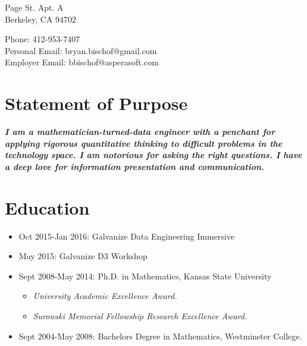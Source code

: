 \documentclass[a4paper,10pt,notitlepage]{article}
\begin{document}
\begin{multicols}{2}{
 Page St. Apt. A\\
Berkeley, CA 94702

\noindent Phone: 412-953-7407\\
Personal Email: bryan.bischof@gmail.com\\
Employer Email: bbischof@asperasoft.com
}
\end{multicols}

\vspace{-10pt}\section*{Statement of Purpose}
\noindent \textit{\textbf{I am a mathematician-turned-data engineer with a penchant for applying rigorous quantitative thinking to difficult problems in the technology space. I am notorious for asking the right questions. I have a deep love for information presentation and communication. }}


\vspace{-10pt}\section*{Education}
\begin{itemize}
	\vspace{-5pt}\item	Oct 2015-Jan 2016: Galvanize Data Engineering Immersive 
	\vspace{-5pt}\item	May 2015: Galvanize D3 Workshop
	\vspace{-5pt}\item	Sept 2008-May 2014: Ph.D. in Mathematics, Kansas State University
		\begin{itemize}
		 \vspace{-5pt}\item \textit{University Academic Excellence Award.}
		 \vspace{-5pt}\item \textit{Surowski Memorial Fellowship Research Excellence Award.}
		 \end{itemize}
	\vspace{-5pt}\item	Sept 2004-May 2008: Bachelors Degree in Mathematics, Westminster College.
\end{itemize}
\end{document}
